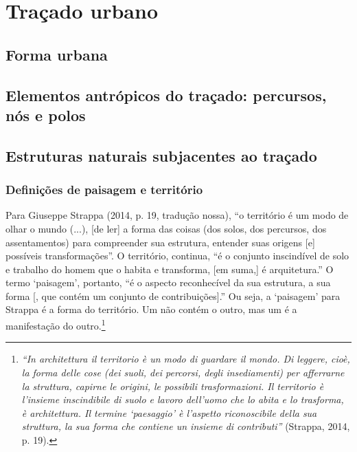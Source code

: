 \documentclass[12pt, a4paper]{book} %
\begin{document}
            \section{Traçado urbano}%
                \subsection{Forma urbana}
                \subsection{Elementos antrópicos do traçado: percursos, nós e polos}
                \subsection{Estruturas naturais subjacentes ao traçado}
                    \subsubsection*{Definições de paisagem e território}
                Para Giuseppe Strappa (2014, p. 19, tradução nossa), %
                    ``o território é um modo de olhar o mundo (...), [de ler] a forma das coisas (dos solos, dos percursos, dos assentamentos) para compreender sua estrutura, entender suas origens [e] possíveis transformações''. O território, continua, ``é o conjunto inscindível de solo e trabalho do homem que o habita e transforma, [em suma,] é arquitetura.'' O termo `paisagem', portanto, ``é o aspecto reconhecível da sua estrutura, a sua forma [, que contém um conjunto de contribuições].'' Ou seja, a `paisagem' para Strappa é a forma do território. Um não contém o outro, mas um é a manifestação do outro.\footnote[11]{\textit{``In architettura il territorio è un modo di guardare il mondo. Di leggere, cioè, la forma delle cose (dei suoli, dei percorsi, degli insediamenti) per afferrarne la struttura, capirne le origini, le possibili trasformazioni. Il territorio è l'insieme inscindibile di suolo e lavoro dell'uomo che lo abita e lo trasforma, è architettura. Il termine `paesaggio' è l'aspetto riconoscibile della sua struttura, la sua forma che contiene un insieme di contributi''} (Strappa, 2014, p. 19).}
\end{document}
